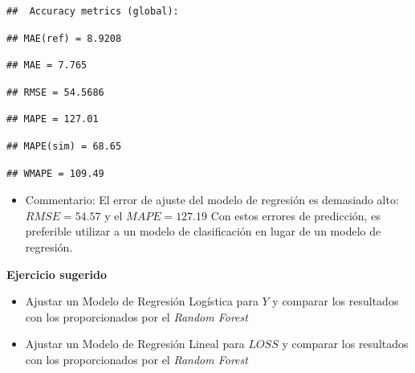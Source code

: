 \documentclass[]{book}
\newenvironment{Shaded}{\begin{snugshade}}{\end{snugshade}}
\newcommand{\DataTypeTok}[1]{\textcolor[rgb]{0.13,0.29,0.53}{#1}}
\newcommand{\KeywordTok}[1]{\textcolor[rgb]{0.13,0.29,0.53}{\textbf{#1}}}
\newcommand{\NormalTok}[1]{#1}
\newcommand{\OperatorTok}[1]{\textcolor[rgb]{0.81,0.36,0.00}{\textbf{#1}}}
\providecommand{\tightlist}{%
  \setlength{\itemsep}{0pt}\setlength{\parskip}{0pt}}
\begin{document}
\begin{Shaded}
\end{Shaded}

\begin{verbatim}
##  Accuracy metrics (global):
\end{verbatim}

\begin{verbatim}
## MAE(ref) = 8.9208
\end{verbatim}

\begin{verbatim}
## MAE = 7.765
\end{verbatim}

\begin{verbatim}
## RMSE = 54.5686
\end{verbatim}

\begin{verbatim}
## MAPE = 127.01
\end{verbatim}

\begin{verbatim}
## MAPE(sim) = 68.65
\end{verbatim}

\begin{verbatim}
## WMAPE = 109.49
\end{verbatim}

\begin{itemize}
\tightlist
\item
  Commentario: El error de ajuste del modelo de regresión es demasiado alto: \(RMSE= 54.57\) y el \(MAPE=127.19%
  \)
  Con estos errores de predicción, es preferible utilizar a un modelo de clasificación en lugar de un modelo de regresión.
\end{itemize}

\textbf{Ejercicio sugerido}

\begin{itemize}
\item
  Ajustar un Modelo de Regresión Logística para \(Y\) y comparar los resultados con los proporcionados por el \emph{Random Forest}
\item
  Ajustar un Modelo de Regresión Lineal para \(LOSS\) y comparar los resultados con los proporcionados por el \emph{Random Forest}
\end{itemize}
\end{document}
